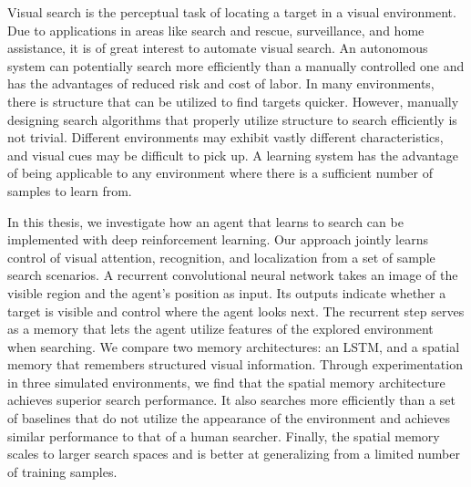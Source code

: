 Visual search is the perceptual task of locating a target in a visual environment.
Due to applications in areas like search and rescue, surveillance, and home assistance, it is of great interest to automate visual search.
An autonomous system can potentially search more efficiently than a manually controlled one and has the advantages of reduced risk and cost of labor.
In many environments, there is structure that can be utilized to find targets quicker.
However, manually designing search algorithms that properly utilize structure to search efficiently is not trivial.
Different environments may exhibit vastly different characteristics, and visual cues may be difficult to pick up.
A learning system has the advantage of being applicable to any environment where there is a sufficient number of samples to learn from.

In this thesis, we investigate how an agent that learns to search can be implemented with deep reinforcement learning.
Our approach jointly learns control of visual attention, recognition, and localization from a set of sample search scenarios.
A recurrent convolutional neural network takes an image of the visible region and the agent's position as input.
Its outputs indicate whether a target is visible and control where the agent looks next.
The recurrent step serves as a memory that lets the agent utilize features of the explored environment when searching.
We compare two memory architectures: an LSTM, and a spatial memory that remembers structured visual information.
Through experimentation in three simulated environments, we find that the spatial memory architecture achieves superior search performance.
It also searches more efficiently than a set of baselines that do not utilize the appearance of the environment and achieves similar performance to that of a human searcher.
Finally, the spatial memory scales to larger search spaces and is better at generalizing from a limited number of training samples.
